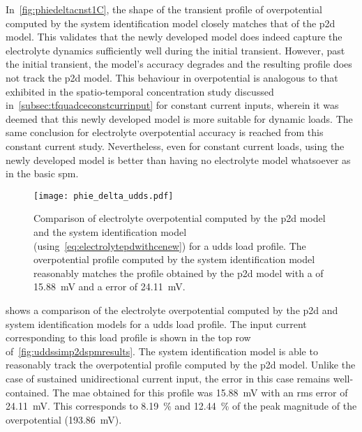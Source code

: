 In~\cref{fig:phiedeltacnst1C},   the  shape   of   the   transient  profile   of
overpotential  computed  by  the  system identification  model  closely  matches
that  of the  \gls{p2d} model.  This validates  that the  newly developed  model
does  indeed  capture the  electrolyte  dynamics  sufficiently well  during  the
initial transient.  However, past  the initial  transient, the  model's accuracy
degrades and  the resulting  profile does  not track  the \gls{p2d}  model. This
behaviour in overpotential is analogous to that exhibited in the spatio-temporal
concentration   study   discussed  in~\cref{subsec:tfquadceconstcurrinput}   for
constant current inputs,  wherein it was deemed that this  newly developed model
is  more  suitable  for  dynamic  loads. The  same  conclusion  for  electrolyte
overpotential   accuracy  is   reached   from  this   constant  current   study.
Nevertheless, even for  constant current loads, using the  newly developed model
is better than having no electrolyte model whatsoever as in the basic \gls{spm}.


\begin{figure}[!htbp]
    \centering
    \texttt{[image: phie\_delta\_udds.pdf]}
    \caption[%
    Electrolyte  overpotential  computed  by the    and  system
    identification models for a  load profile
    ]%
    {%
        Comparison    of    electrolyte    overpotential   computed    by    the
        \gls{p2d}     model    and     the    system     identification    model
        (using~\cref{eq:electrolytepdwithcenew}) for a  \gls{udds} load profile.
        The overpotential  profile computed  by the system  identification model
        reasonably matches  the profile obtained  by the \gls{p2d} model  with a
         of \SI{15.88}{\milli\volt} and  a  error of
        \SI{24.11}{\milli\volt}.
    }%
    \label{fig:phiedeltacnstudds}
\end{figure}

 shows a comparison of the electrolyte overpotential
computed by the \gls{p2d} and system identification models for a \gls{udds} load
profile. The  input current corresponding to  this load profile is  shown in the
top row  of~\cref{fig:uddssimp2dspmresults}. The system identification  model is
able to  reasonably track  the overpotential profile  computed by  the \gls{p2d}
model. Unlike the  case of sustained unidirectional current input,  the error in
this case  remains well-contained. The  \gls{mae} obtained for this  profile was
\SI{15.88}{\milli\volt}  with  an  \gls{rms} error  of  \SI{24.11}{\milli\volt}.
This  corresponds to  \SI{8.19}{\percent} and  \SI{12.44}{\percent} of  the peak
magnitude of the overpotential (\SI{193.86}{\milli\volt}).


